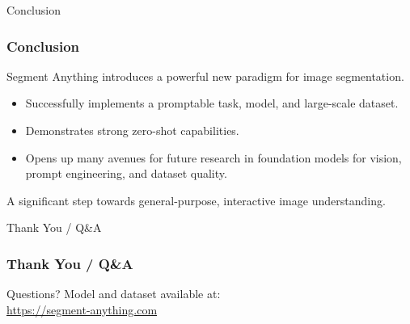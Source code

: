 \documentclass{beamer}
\begin{document}
\begin{frame}{Conclusion}
    \frametitle{Conclusion}
    Segment Anything introduces a powerful new paradigm for image segmentation.
    \begin{itemize}
        \item Successfully implements a promptable task, model, and large-scale dataset.
        \item Demonstrates strong zero-shot capabilities.
        \item Opens up many avenues for future research in foundation models for vision, prompt engineering, and dataset quality.
    \end{itemize}
    A significant step towards general-purpose, interactive image understanding.
\end{frame}

\begin{frame}{Thank You / Q&A}
    \frametitle{Thank You / Q\&A}
    Questions?
    \vfill
    Model and dataset available at: \\ \url{https://segment-anything.com}
\end{frame}
\end{document}
